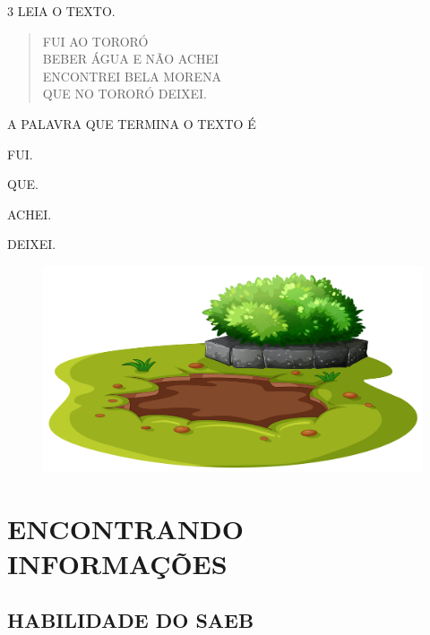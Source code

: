 \num{3} LEIA O TEXTO.

\begin{myquote}
\begin{verse}
FUI AO TORORÓ\\
BEBER ÁGUA E NÃO ACHEI\\
ENCONTREI BELA MORENA\\
QUE NO TORORÓ DEIXEI.
\end{verse}

\end{myquote}

A PALAVRA QUE TERMINA O TEXTO É

\begin{escolha}
\item FUI.

\item QUE.

\item ACHEI.

\item DEIXEI.
\end{escolha}

\begin{figure}[H]
\includegraphics[width=\textwidth]{media/image262.png}
\end{figure}

\chapter{ENCONTRANDO INFORMAÇÕES}

\section*{HABILIDADE DO SAEB}

